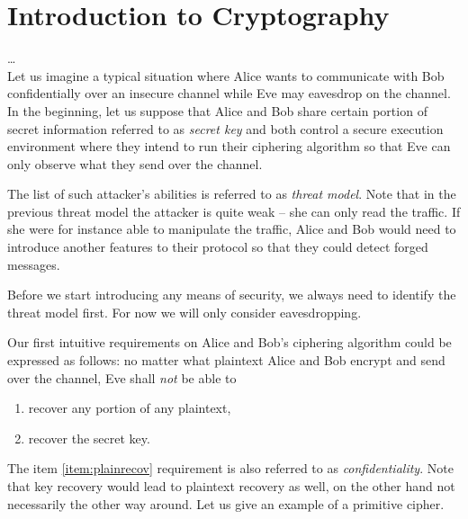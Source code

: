 \section{Introduction to Cryptography}
\label{sec:introcrypto}


\ldots\\
Let us imagine a typical situation where Alice wants to communicate with Bob confidentially over an insecure channel while Eve may eavesdrop on the channel. In the beginning, let us suppose that Alice and Bob share certain portion of secret information referred to as {\em secret key} and both control a secure execution environment where they intend to run their ciphering algorithm so that Eve can only observe what they send over the channel.

\begin{note}
\label{note:threat}
	The list of such attacker's abilities is referred to as {\em threat model}. Note that in the previous threat model the attacker is quite weak -- she can only read the traffic. If she were for instance able to manipulate the traffic, Alice and Bob would need to introduce another features to their protocol so that they could detect forged messages.
	
	Before we start introducing any means of security, we always need to identify the threat model first. For now we will only consider eavesdropping.   %
\end{note}

Our first intuitive requirements on Alice and Bob's ciphering algorithm could be expressed as follows: no matter what plaintext Alice and Bob encrypt and send over the channel, Eve shall {\em not} be able to
\begin{enumerate}
	\item recover any portion of any plaintext, \label{item:plainrecov}
	\item recover the secret key. \label{item:keyrecov}
\end{enumerate}
The item \ref{item:plainrecov} requirement is also referred to as {\em confidentiality}. Note that key recovery would lead to plaintext recovery as well, on the other hand not necessarily the other way around. Let us give an example of a primitive cipher.

